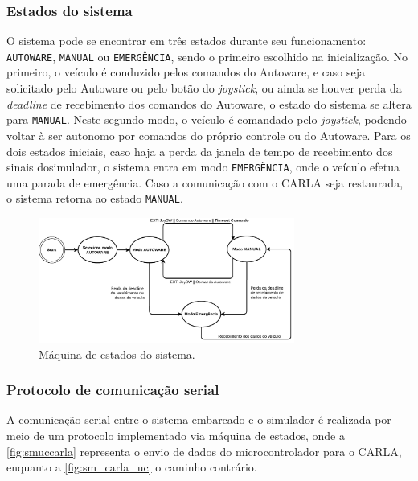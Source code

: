\subsubsection*{Estados do sistema}

O sistema pode se encontrar em três estados durante seu funcionamento: \texttt{AUTOWARE}, \texttt{MANUAL} ou \texttt{EMERGÊNCIA}, sendo o primeiro escolhido na inicialização. No primeiro, o veículo é conduzido pelos comandos do Autoware, e caso seja solicitado pelo Autoware ou pelo botão do \textit{joystick}, ou ainda se houver perda da \textit{deadline} de recebimento dos comandos do Autoware, o estado do sistema se altera para \texttt{MANUAL}. Neste segundo modo, o veículo é comandado pelo \textit{joystick}, podendo voltar à ser autonomo por comandos do próprio controle ou do Autoware. Para os dois estados iniciais, caso haja a perda da janela de tempo de recebimento dos sinais dosimulador, o sistema entra em modo \texttt{EMERGÊNCIA}, onde o veículo efetua uma parada de emergência. Caso a comunicação com o CARLA seja restaurada, o sistema retorna ao estado \texttt{MANUAL}.

\begin{figure}[H]
	\centering
	\includegraphics[width = 0.75\textwidth]{img/maquinadeestados}
	\caption{Máquina de estados do sistema.}
	\label{fig:maquinadeestados}
\end{figure}

\subsubsection*{Protocolo de comunicação serial}

A comunicação serial entre o sistema embarcado e o simulador é realizada por meio de um protocolo implementado via máquina de estados, onde a \autoref{fig:smuccarla} representa o envio de dados do microcontrolador para o CARLA, enquanto a \autoref{fig:sm_carla_uc} o caminho contrário.

